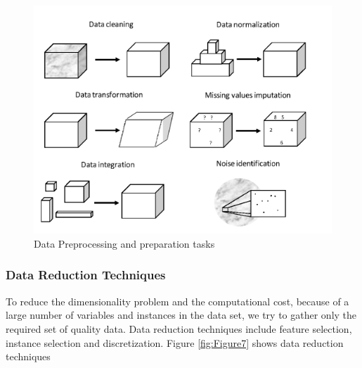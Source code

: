 \documentclass[sigconf]{acmart}
\begin{document}
\begin{figure}[htb]
  \centering
  \includegraphics[width=1.0\columnwidth]{images/Figure6.png}
  \caption{Data Preprocessing and preparation tasks
  \cite{preprocessing}}
  \label{fig:Figure6} 
\end{figure}

\subsubsection{Data Reduction Techniques}

To reduce the dimensionality problem and the computational cost, because of a large number of variables and instances in the data set, we try to gather only the required set of quality data. Data reduction techniques include feature selection, instance selection and discretization. Figure \ref{fig:Figure7} shows data reduction techniques \cite{preprocessing}
\end{document}
